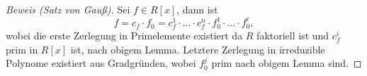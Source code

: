 \begin{proof}[Beweis (Satz von Gauß)]
    Sei $f \in R[x]$, dann ist
    $$ f = c_f \cdot f_0 = c_f^1 \cdot \hdots \cdot c_f^n \cdot f_0^1 \cdot \hdots \cdot f_0^\ell, $$
    wobei die erste Zerlegung in Primelemente existiert da $R$ faktoriell ist und $c_f^i$ prim in $R[x]$ ist, nach obigem Lemma. Letztere Zerlegung in irreduzible Polynome existiert aus Gradgründen, wobei $f_0^j$ prim nach obigem Lemma sind.
\end{proof}